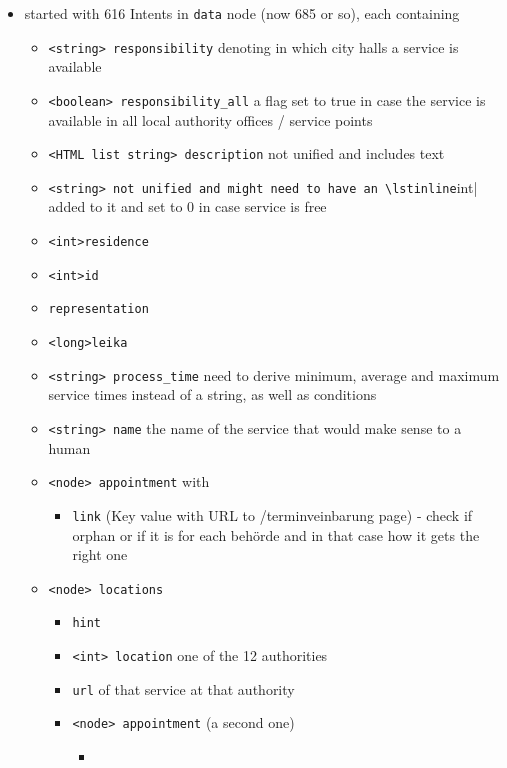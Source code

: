 \begin{itemize}
	\item started with 616 Intents in \lstinline|data| node (now 685 or so), each containing
	\begin{itemize}
		\item \lstinline|<string> responsibility| denoting in which city halls a service is available
		\item \lstinline|<boolean> responsibility_all| a flag set to true in case the service is available in all local authority offices / service points
		\item \lstinline|<HTML list string> description| not unified and includes text
		\item  \lstinline|<string> not unified and might need to have an \lstinline|int| added to it and set to 0 in case service is free
		\item \lstinline|<int>residence|
		\item \lstinline|<int>id|
		\item \lstinline|representation|
		\item \lstinline|<long>leika|
		\item \lstinline|<string> process_time| need to derive minimum, average and maximum service times instead of a string, as well as conditions 
		\item \lstinline|<string> name| the name of the service that would make sense to a human
		\item \lstinline|<node> appointment| with 
		\begin{itemize}
			\item \lstinline|link| (Key value with URL to /terminveinbarung page) - check if orphan or if it is for each beh\"orde and in that case how it gets the right one
		\end{itemize}	 
		\item \lstinline|<node> locations| 
		\begin{itemize}
			\item \lstinline|hint|
			\item \lstinline|<int> location| one of the 12 authorities
			\item \lstinline|url| of that service at that authority
			\item \lstinline|<node> appointment| (a second one)
			\begin{itemize}
				\item 
			\end{itemize}
		\end{itemize}
		

\end{itemize}
\end{itemize}
